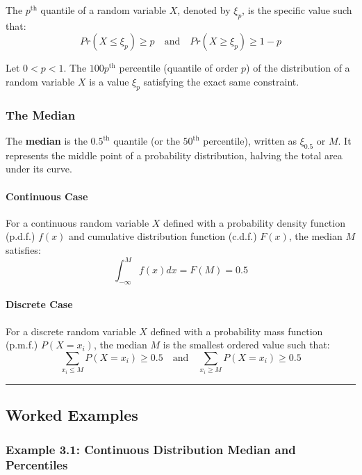 \documentclass[
]{article}
\begin{document}
The \(p^{\text{th}}\) quantile of a random variable \(X\), denoted by
\(\xi_{p}\), is the specific value such that:
\[Pr(X \le \xi_{p}) \ge p \quad \text{and} \quad Pr(X \ge \xi_{p}) \ge 1-p\]

Let \(0 < p < 1\). The \(100p^{\text{th}}\) percentile (quantile of
order \(p\)) of the distribution of a random variable \(X\) is a value
\(\xi_{p}\) satisfying the exact same constraint.

\subsubsection{The Median}\label{the-median}

The \textbf{median} is the \(0.5^{\text{th}}\) quantile (or the
\(50^{\text{th}}\) percentile), written as \(\xi_{0.5}\) or \(M\). It
represents the middle point of a probability distribution, halving the
total area under its curve.

\paragraph{Continuous Case}\label{continuous-case}

For a continuous random variable \(X\) defined with a probability
density function (p.d.f.) \(f(x)\) and cumulative distribution function
(c.d.f.) \(F(x)\), the median \(M\) satisfies:
\[\int_{-\infty}^{M} f(x)dx = F(M) = 0.5\]

\paragraph{Discrete Case}\label{discrete-case}

For a discrete random variable \(X\) defined with a probability mass
function (p.m.f.) \(P(X=x_i)\), the median \(M\) is the smallest ordered
value such that:
\[\sum_{x_i \le M} P(X = x_i) \ge 0.5 \quad \text{and} \quad \sum_{x_i \ge M} P(X = x_i) \ge 0.5\]

\begin{center}\rule{0.5\linewidth}{0.5pt}\end{center}

\subsection{Worked Examples}\label{worked-examples}

\subsubsection{Example 3.1: Continuous Distribution Median and
Percentiles}\label{example-3.1-continuous-distribution-median-and-percentiles}
\end{document}
